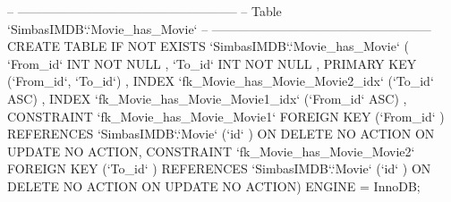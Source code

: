 \begin{spverbatim}
-- -----------------------------------------------------
-- Table `SimbasIMDB`.`Movie_has_Movie`
-- -----------------------------------------------------
CREATE  TABLE IF NOT EXISTS `SimbasIMDB`.`Movie_has_Movie` (
  `From_id` INT NOT NULL ,
  `To_id` INT NOT NULL ,
  PRIMARY KEY (`From_id`, `To_id`) ,
  INDEX `fk_Movie_has_Movie_Movie2_idx` (`To_id` ASC) ,
  INDEX `fk_Movie_has_Movie_Movie1_idx` (`From_id` ASC) ,
  CONSTRAINT `fk_Movie_has_Movie_Movie1`
    FOREIGN KEY (`From_id` )
    REFERENCES `SimbasIMDB`.`Movie` (`id` )
    ON DELETE NO ACTION
    ON UPDATE NO ACTION,
  CONSTRAINT `fk_Movie_has_Movie_Movie2`
    FOREIGN KEY (`To_id` )
    REFERENCES `SimbasIMDB`.`Movie` (`id` )
    ON DELETE NO ACTION
    ON UPDATE NO ACTION)
ENGINE = InnoDB;
\end{spverbatim}
\newpage
